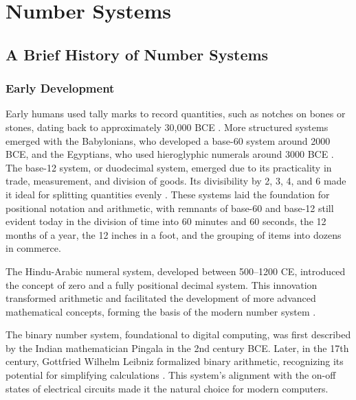 \chapter{Number Systems}\label{chapt:number_systems}
\localtoc
\section{A Brief History of Number Systems}
\subsection{Early Development}
Early humans used tally marks to record quantities, such as notches on bones or stones, dating back to approximately 30,000 BCE \cite{ifrah2000}. More structured systems emerged with the Babylonians, who developed a base-60 system around 2000 BCE, and the Egyptians, who used hieroglyphic numerals around 3000 BCE \cite{ore1990number}. The base-12 system, or duodecimal system, emerged due to its practicality in trade, measurement, and division of goods. Its divisibility by 2, 3, 4, and 6 made it ideal for splitting quantities evenly \cite{wells2010number}. These systems laid the foundation for positional notation and arithmetic, with remnants of base-60 and base-12 still evident today in the division of time into 60 minutes and 60 seconds, the 12 months of a year, the 12 inches in a foot, and the grouping of items into dozens in commerce.

The Hindu-Arabic numeral system, developed between 500–1200 CE, introduced the concept of zero and a fully positional decimal system. This innovation transformed arithmetic and facilitated the development of more advanced mathematical concepts, forming the basis of the modern number system \cite{kline1990mathematics}.

The binary number system, foundational to digital computing, was first described by the Indian mathematician Pingala in the 2nd century BCE. Later, in the 17th century, Gottfried Wilhelm Leibniz formalized binary arithmetic, recognizing its potential for simplifying calculations \cite{kline1990mathematics}. This system’s alignment with the on-off states of electrical circuits made it the natural choice for modern computers.


